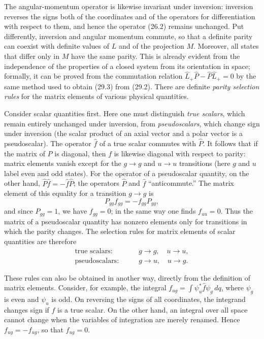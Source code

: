 The angular-momentum operator is likewise invariant under inversion:
inversion reverses the signs both of the coordinates and of the operators for
differentiation with respect to them, and hence the operator (26.2) remains
unchanged. Put differently, inversion and angular momentum commute, so that
a definite parity can coexist with definite values of $L$ and of the
projection $M$. Moreover, all states that differ only in $M$ have the same
parity. This is already evident from the independence of the properties of a
closed system from its orientation in space; formally, it can be proved from
the commutation relation $\hat L_+\hat P-\hat P\hat L_+=0$ by the same method
used to obtain (29.3) from (29.2).
There are definite \emph{parity selection rules} for the matrix elements of
various physical quantities.

Consider scalar quantities first. Here one must distinguish \emph{true
scalars}, which remain entirely unchanged under inversion, from
\emph{pseudoscalars}, which change sign under inversion (the scalar product of
an axial vector and a polar vector is a pseudoscalar). The operator $\hat f$
of a true scalar commutes with $\hat P$. It follows that if the matrix of $P$
is diagonal, then $f$ is likewise diagonal with respect to parity: matrix
elements vanish except for the $g\to g$ and $u\to u$ transitions (here $g$
and $u$ label even and odd states).
For the operator of a pseudoscalar quantity, on the other hand,
$\hat P\hat f=-\hat f\hat P$; the operators $\hat P$ and $\hat f$
“anticommute.” The matrix element of this equality for a transition
$g\to g$ is
\[
  P_{gg}f_{gg}=-f_{gg}P_{gg},
\]
and since $P_{gg}=1$, we have $f_{gg}=0$; in the same way one finds
$f_{uu}=0$. Thus the matrix of a pseudoscalar quantity has nonzero elements
only for transitions in which the parity changes. The selection rules for
matrix elements of scalar quantities are therefore
\begin{equation}
 \begin{aligned}
  \text{true scalars:}&\qquad g\to g,\quad u\to u,\\
  \text{pseudoscalars:}&\qquad g\to u,\quad u\to g.
 \end{aligned}
 \tag{30.4}
\end{equation}

These rules can also be obtained in another way, directly from the definition
of matrix elements. Consider, for example, the integral
$f_{ug}=\int\psi_u^*\hat f\psi_g\,dq$, where $\psi_g$ is even and $\psi_u$
is odd. On reversing the signs of all coordinates, the integrand changes sign
if $f$ is a true scalar. On the other hand, an integral over all space cannot
change when the variables of integration are merely renamed. Hence
$f_{ug}=-f_{ug}$, so that $f_{ug}=0$.

